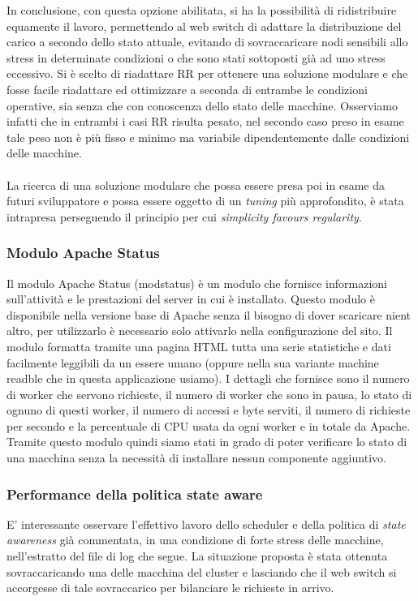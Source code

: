 \documentclass[italian]{tktltiki2}
\begin{document}
In conclusione, con questa opzione abilitata, si ha la possibilità di ridistribuire equamente il lavoro, permettendo al web switch di adattare la distribuzione del carico a secondo dello stato attuale, evitando di sovraccaricare nodi sensibili allo stress in determinate condizioni o che sono stati sottoposti già ad uno stress eccessivo. Si è scelto di riadattare RR per ottenere una soluzione modulare e che fosse facile riadattare ed ottimizzare a seconda di entrambe le condizioni operative, sia senza che con conoscenza dello stato delle macchine. Osserviamo infatti che in entrambi i casi RR risulta pesato, nel secondo caso preso in esame tale peso non è più fisso e minimo ma variabile dipendentemente dalle condizioni delle macchine.\\\\
La ricerca di una soluzione modulare che possa essere presa poi in esame da futuri sviluppatore e possa essere oggetto di un \emph{tuning} più approfondito, è stata intrapresa perseguendo il principio per cui \emph{simplicity favours regularity}.

\subsubsection{Modulo Apache Status}
\label{sssec:apachestatus}
Il modulo Apache Status (modstatus) è un modulo che fornisce informazioni sull'attività e le prestazioni del server in cui è installato. Questo modulo è disponibile nella versione base di Apache senza il bisogno di dover scaricare nient altro, per utilizzarlo è necessario solo attivarlo nella configurazione del sito. Il modulo formatta tramite una pagina HTML tutta una serie statistiche e dati facilmente leggibili da un essere umano (oppure nella sua variante machine readble che in questa applicazione usiamo). I dettagli che fornisce sono il numero di worker che servono richieste, il numero di worker che sono in pausa, lo stato di ognuno di questi worker, il numero di accessi e byte serviti, il numero di richieste per secondo e la percentuale di CPU usata da ogni worker e in totale da Apache.
Tramite questo modulo quindi siamo stati in grado di poter verificare lo stato di una macchina senza la necessità di installare nessun componente aggiuntivo.
\subsubsection{Performance della politica state aware}
E' interessante osservare l'effettivo lavoro dello scheduler e della politica di \emph{state awareness} già commentata, in una condizione di forte stress delle macchine, nell'estratto del file di log che segue. La situazione proposta è stata ottenuta sovraccaricando una delle macchina del cluster e lasciando che il web switch si accorgesse di tale sovraccarico per bilanciare le richieste in arrivo.
\end{document}
